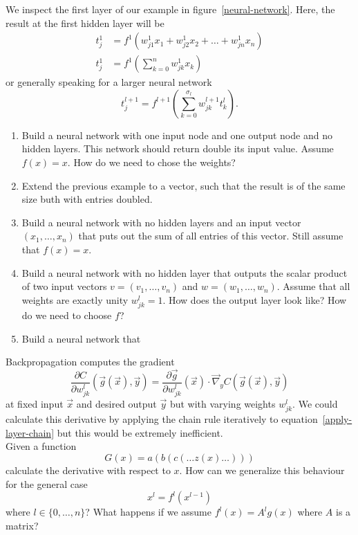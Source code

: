 We inspect the first layer of our example in figure~\ref{neural-network}.
Here, the result at the first hidden layer will be
\begin{align}
    t^1_j &= f^1\left(w^1_{j1}x_1 + w^1_{j2}x_2 + \dots + w^1_{jn}x_n\right)\\
    t^1_j &= f^1\left(\sum\limits_{k=0}^n w^1_{jk}x_k\right)
\end{align}
or generally speaking for a larger neural network
\begin{equation}
    t^{l+1}_j = f^{l+1}\left(\sum\limits_{k=0}^{\sigma_{l}} w^{l+1}_{jk} t^{l}_k\right).
\end{equation}
\begin{enumerate}
    \item Build a neural network with one input node and one output node and no hidden layers.
    This network should return double its input value.
    Assume $f(x)=x$.
    How do we need to chose the weights?
    \item Extend the previous example to a vector, such that the result is of the same size buth with entries doubled.
    \item Build a neural network with no hidden layers and an input vector $(x_1,\dots,x_n)$ that puts out the sum of all entries of this vector.
    Still assume that $f(x)=x$.
    \item Build a neural network with no hidden layer that outputs the scalar product of two input vectors $v=(v_1,\dots,v_n)$ and $w=(w_1,\dots,w_n)$.
    Assume that all weights are exactly unity $w^l_{jk}=1$.
    How does the output layer look like?
    How do we need to choose $f$?
    \item Build a neural network that 
\end{enumerate}
%
%
Backpropagation computes the gradient
\begin{equation}
    \frac{\partial C}{\partial w^l_{jk}}(\vec{g}(\vec{x}),\vec{y}) = \frac{\partial\vec{g}}{\partial w^l_{jk}}(\vec{x})\cdot\vec{\nabla}_yC\left(\vec{g}(\vec{x}), \vec{y}\right)
\end{equation}
at fixed input $\vec{x}$ and desired output $\vec{y}$ but with varying weights $w^l_{jk}$.
We could calculate this derivative by applying the chain rule iteratively to equation~\ref{apply-layer-chain} but this would be extremely inefficient.\\
Given a function
\begin{equation}
    G(x) = a(b(c(\dots z(x)\dots)))
\end{equation}
calculate the derivative with respect to $x$.
How can we generalize this behaviour for the general case
\begin{equation}
    x^l = f^l(x^{l-1})
\end{equation}
where $l\in\{0,\dots,n\}$?
What happens if we assume $f^l(x)=A^l g(x)$ where $A$ is a matrix?